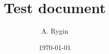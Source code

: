 \documentclass{article}
\title{Test document}
\author{A. Rygin}
\date{\today}
\begin{document}
\maketitle

\lipsum
\end{document}
